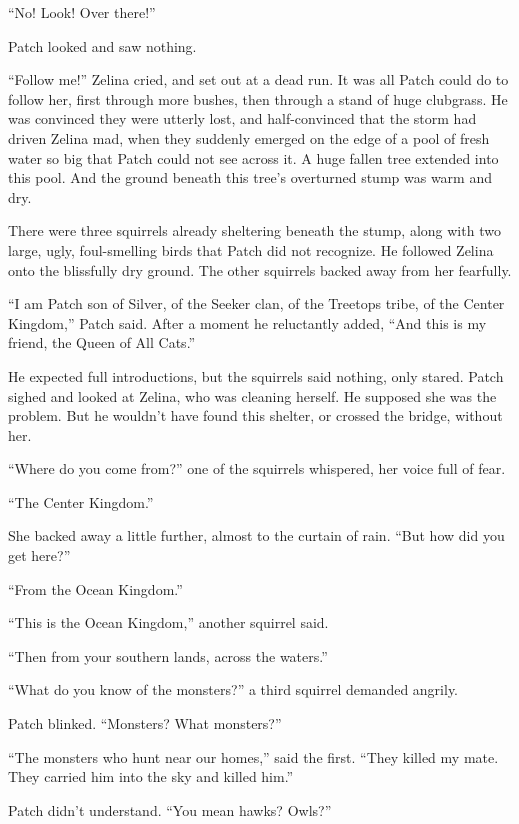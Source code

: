 \documentclass[ebook,oneside,openany,17pt]{memoir}
\newenvironment{tolerant}[1]{%
  \par\tolerance=#1\relax
}{%
  \par
}
\begin{document}
“No! Look! Over there!”

Patch looked and saw nothing.

“Follow me!” Zelina cried, and set out at a dead run. It was all Patch
could do to follow her, first through more bushes, then through a
stand of huge clubgrass. He was convinced they were utterly lost, and
half-convinced that the storm had driven Zelina mad, when they
suddenly emerged on the edge of a pool of fresh water so big that
Patch could not see across it. A huge fallen tree extended into this
pool. And the ground beneath this tree’s overturned stump was warm and
dry.

\begin{tolerant}{1000}
There were three squirrels already sheltering beneath the stump, along
with two large, ugly, foul-smelling birds that Patch did not
recognize. He followed Zelina onto the blissfully dry ground. The
other squirrels backed away from her fearfully.
\end{tolerant}

“I am Patch son of Silver, of the Seeker clan, of the Treetops tribe,
of the Center Kingdom,” Patch said. After a moment he reluctantly
added, “And this is my friend, the Queen of All Cats.”

He expected full introductions, but the squirrels said nothing, only
stared. Patch sighed and looked at Zelina, who was cleaning
herself. He supposed she was the problem. But he wouldn’t have found
this shelter, or crossed the bridge, without her.

“Where do you come from?” one of the squirrels whispered, her voice
full of fear.

“The Center Kingdom.”

She backed away a little further, almost to the curtain of rain. “But
how did you get here?”

“From the Ocean Kingdom.”

“This is the Ocean Kingdom,” another squirrel said.

“Then from your southern lands, across the waters.”

“What do you know of the monsters?” a third squirrel demanded angrily.

Patch blinked. “Monsters? What monsters?”

“The monsters who hunt near our homes,” said the first. “They killed
my mate. They carried him into the sky and killed him.”

\begin{tolerant}{5000}
Patch didn’t understand. “You mean hawks? Owls?”
\end{tolerant}
\end{document}

